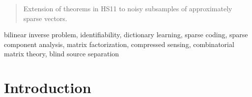 \documentclass[journal,onecolumn]{IEEEtran}
\begin{document}







\maketitle


\begin{abstract}
Extension of theorems in HS11 to noisy subsamples of approximately sparse vectors.
\end{abstract}


\begin{IEEEkeywords}
bilinear inverse problem, identifiability, dictionary learning, sparse coding, sparse component analysis, matrix factorization, compressed sensing, combinatorial matrix theory, blind source separation
\end{IEEEkeywords}

%

\section{Introduction}
% 
% 
% 
% 
\end{document}
